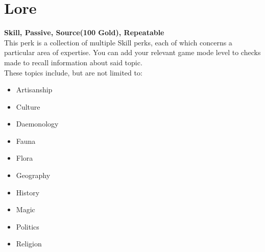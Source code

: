 \section{Lore}\label{sec:lore}
\textbf{Skill, Passive, Source(100 Gold), Repeatable}\\
This perk is a collection of multiple Skill perks, each of which concerns a particular area of expertise.
You can add your relevant game mode level to checks made to recall information about said topic.\\
These topics include, but are not limited to:\\

\begin{itemize}
    \item Artisanship
    \item Culture
    \item Daemonology
    \item Fauna
    \item Flora
    \item Geography
    \item History
    \item Magic
    \item Politics
    \item Religion
\end{itemize}